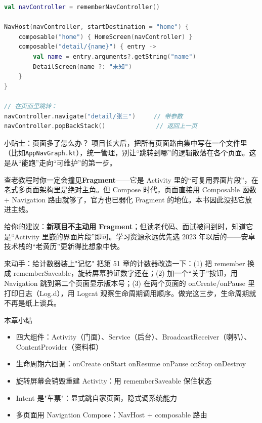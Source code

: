 \begin{lstlisting}[language=Kotlin]
val navController = rememberNavController()

NavHost(navController, startDestination = "home") {
    composable("home") { HomeScreen(navController) }
    composable("detail/{name}") { entry ->
        val name = entry.arguments?.getString("name")
        DetailScreen(name ?: "未知")
    }
}

// 在页面里跳转：
navController.navigate("detail/张三")     // 带参数
navController.popBackStack()              // 返回上一页
\end{lstlisting}

\begin{tcbinfo}{小贴士：页面多了怎么办？}
项目长大后，把所有页面路由集中写在一个文件里（比如\texttt{AppNavGraph.\allowbreak kt}），统一管理，别让“跳转到哪”的逻辑散落在各个页面。这是从“能跑”走向“可维护”的第一步。

\end{tcbinfo}


查老教程时你一定会撞见\textbf{Fragment}——它是 Activity 里的“可复用界面片段”，在老式多页面架构里是绝对主角。但 Compose 时代，页面直接用 Composable 函数 + Navigation 路由就够了，官方也已弱化 Fragment 的地位。本书因此没把它放进主线。

给你的建议：\textbf{新项目不主动用 Fragment}；但读老代码、面试被问到时，知道它是“Activity 里嵌的界面片段”即可。学习资源永远优先选 2023 年以后的——安卓技术栈的“老黄历”更新得比想象中快。

\begin{tcbpractice}{来动手：给计数器装上"记忆"}
把第 51 章的计数器改造一下：(1) 把 remember 换成 rememberSaveable，旋转屏幕验证数字还在；(2) 加一个“关于”按钮，用 Navigation 跳到第二个页面显示版本号；(3) 在两个页面的 onCreate/onPause 里打印日志（Log.d），用 Logcat 观察生命周期调用顺序。做完这三步，生命周期就不再是纸上谈兵。

\end{tcbpractice}

\begin{tcbsummary}{本章小结}
\begin{itemize}
  \item 四大组件：Activity（门面）、Service（后台）、BroadcastReceiver（喇叭）、ContentProvider（资料柜）
  \item 生命周期六回调：onCreate onStart onResume onPause onStop onDestroy
  \item 旋转屏幕会销毁重建 Activity：用 rememberSaveable 保住状态
  \item Intent 是"车票"：显式跳自家页面，隐式调系统能力
  \item 多页面用 Navigation Compose：NavHost + composable 路由
\end{itemize}

\end{tcbsummary}
